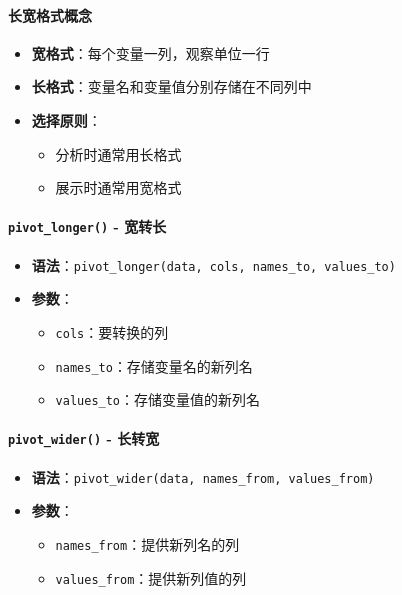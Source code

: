 \documentclass[
]{book}
\providecommand{\tightlist}{%
  \setlength{\itemsep}{0pt}\setlength{\parskip}{0pt}}
\begin{document}
\hypertarget{ux957fux5bbdux683cux5f0fux6982ux5ff5}{%
\paragraph{长宽格式概念}\label{ux957fux5bbdux683cux5f0fux6982ux5ff5}}

\begin{itemize}
\tightlist
\item
  \textbf{宽格式}：每个变量一列，观察单位一行
\item
  \textbf{长格式}：变量名和变量值分别存储在不同列中
\item
  \textbf{选择原则}：

  \begin{itemize}
  \tightlist
  \item
    分析时通常用长格式
  \item
    展示时通常用宽格式
  \end{itemize}
\end{itemize}

\hypertarget{pivot_longer---ux5bbdux8f6cux957f}{%
\paragraph{\texorpdfstring{\texttt{pivot\_longer()} - 宽转长}{pivot\_longer() - 宽转长}}\label{pivot_longer---ux5bbdux8f6cux957f}}

\begin{itemize}
\tightlist
\item
  \textbf{语法}：\texttt{pivot\_longer(data,\ cols,\ names\_to,\ values\_to)}
\item
  \textbf{参数}：

  \begin{itemize}
  \tightlist
  \item
    \texttt{cols}：要转换的列
  \item
    \texttt{names\_to}：存储变量名的新列名
  \item
    \texttt{values\_to}：存储变量值的新列名
  \end{itemize}
\end{itemize}

\hypertarget{pivot_wider---ux957fux8f6cux5bbd}{%
\paragraph{\texorpdfstring{\texttt{pivot\_wider()} - 长转宽}{pivot\_wider() - 长转宽}}\label{pivot_wider---ux957fux8f6cux5bbd}}

\begin{itemize}
\tightlist
\item
  \textbf{语法}：\texttt{pivot\_wider(data,\ names\_from,\ values\_from)}
\item
  \textbf{参数}：

  \begin{itemize}
  \tightlist
  \item
    \texttt{names\_from}：提供新列名的列
  \item
    \texttt{values\_from}：提供新列值的列
  \end{itemize}
\end{itemize}
\end{document}
